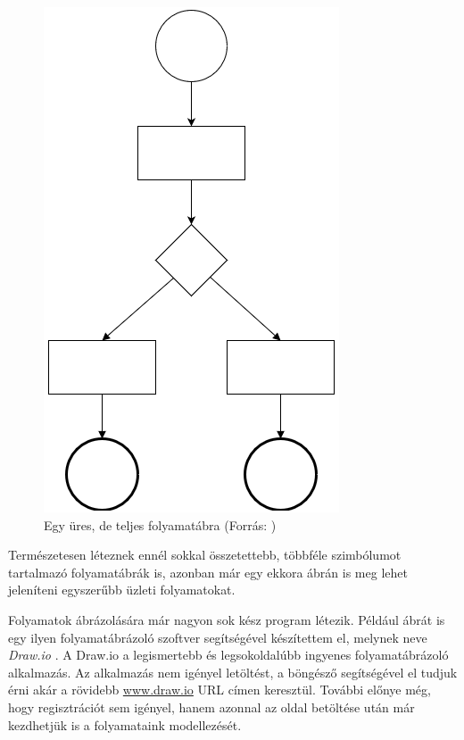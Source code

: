 \begin{figure}[h]
\centering
\includegraphics[scale=0.8]{images/uresfolyamat.png}
\caption{Egy üres, de teljes folyamatábra (Forrás: \cite{drawio})}
\label{fig:uresfolyamat}
\end{figure}

Természetesen léteznek ennél sokkal összetettebb, többféle szimbólumot tartalmazó folyamatábrák is, azonban már egy ekkora ábrán is meg lehet jeleníteni egyszerűbb üzleti folyamatokat.



Folyamatok ábrázolására már nagyon sok kész program létezik. Például  ábrát is egy ilyen folyamatábrázoló szoftver segítségével készítettem el, melynek neve \textit{Draw.io} \cite{drawio}. A Draw.io a legismertebb és legsokoldalúbb ingyenes folyamatábrázoló alkalmazás. Az alkalmazás nem igényel letöltést, a böngésző segítségével el tudjuk érni akár a rövidebb \url{www.draw.io} URL címen keresztül. További előnye még, hogy regisztrációt sem igényel, hanem azonnal az oldal betöltése után már kezdhetjük is a folyamataink modellezését.

